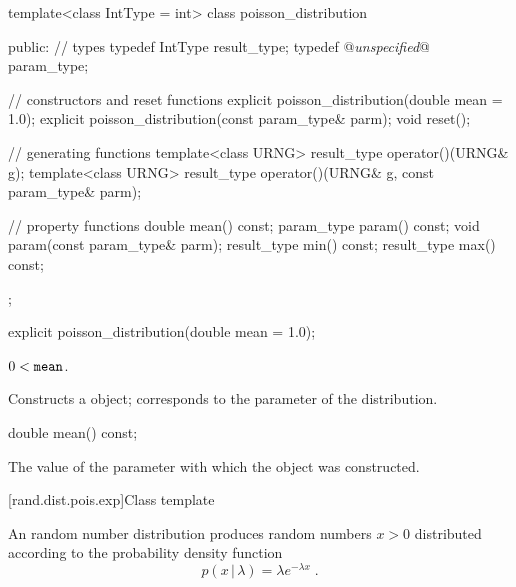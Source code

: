 \begin{codeblock}
template<class IntType = int>
 class poisson_distribution
{
public:
 // types
 typedef IntType result_type;
 typedef @\textit{unspecified}@ param_type;

 // constructors and reset functions
 explicit poisson_distribution(double mean = 1.0);
 explicit poisson_distribution(const param_type& parm);
 void reset();

 // generating functions
 template<class URNG>
   result_type operator()(URNG& g);
 template<class URNG>
   result_type operator()(URNG& g, const param_type& parm);

 // property functions
 double mean() const;
 param_type param() const;
 void param(const param_type& parm);
 result_type min() const;
 result_type max() const;
};
\end{codeblock}



%
\begin{itemdecl}
explicit poisson_distribution(double mean = 1.0);
\end{itemdecl}

\begin{itemdescr}
\pnum\requires
 $ 0 < \texttt{mean} $.

\pnum\effects Constructs a  object;
 corresponds to the parameter of the distribution.
\end{itemdescr}

%
%
\begin{itemdecl}
double mean() const;
\end{itemdecl}

\begin{itemdescr}
\pnum\returns The value of the  parameter
 with which the object was constructed.
\end{itemdescr}


[rand.dist.pois.exp]{Class template }%
%

\pnum
An  random number distribution
produces random numbers $x > 0$
distributed according to
the probability density function%
%
\[%
 p(x\,|\,\lambda)
      = \lambda e^{-\lambda x}
\; \mbox{.}
\]

